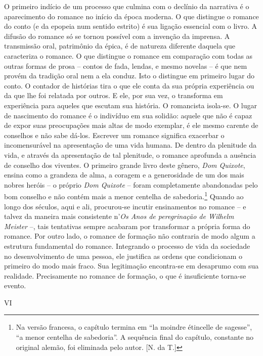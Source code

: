 O primeiro indício de um processo que culmina com o declínio da
narrativa é o aparecimento do romance no início da época moderna. O que
distingue o romance do conto (e da epopeia num sentido estrito) é sua
ligação essencial com o livro. A difusão do romance só se tornou
possível com a invenção da imprensa. A transmissão oral, patrimônio da
épica, é de natureza diferente daquela que caracteriza o romance. O que
distingue o romance em comparação com todas as outras formas de prosa --
contos de fada, lendas, e mesmo novelas -- é que nem provém da tradição
oral nem a ela conduz. Isto o distingue em primeiro lugar do conto. O
contador de histórias tira o que ele conta da sua própria experiência ou
da que lhe foi relatada por outros. E ele, por sua vez, o transforma em
experiência para aqueles que escutam sua história. O romancista
isola-se. O lugar de nascimento do romance é o indivíduo em sua solidão:
aquele que não é capaz de expor suas preocupações mais altas de modo
exemplar, é ele mesmo carente de conselhos e não sabe dá-los. Escrever
um romance significa exacerbar o incomensurável na apresentação de uma
vida humana. De dentro da plenitude da vida, e através da apresentação
de tal plenitude, o romance aprofunda a ausência de conselho dos
viventes. O primeiro grande livro deste gênero, \emph{Dom Quixote},
ensina como a grandeza de alma, a coragem e a generosidade de um dos
mais nobres heróis -- o próprio \emph{Dom Quixote} -- foram
completamente abandonadas pelo bom conselho e não contém mais a menor
centelha de sabedoria.\footnote{Na versão francesa, o capítulo termina
  em ``la moindre étincelle de sagesse'', ``a menor centelha de
  sabedoria''. A sequência final do capítulo, constante no original
  alemão, foi eliminada pelo autor. {[}N. da T.{]}} Quando ao longo dos
séculos, aqui e ali, procurou-se incutir ensinamentos no romance -- e
talvez da maneira mais consistente n'\emph{Os Anos de peregrinação de
Wilhelm Meister} --, tais tentativas sempre acabaram por transformar a
própria forma do romance. Por outro lado, o romance de formação não
contraria de modo algum a estrutura fundamental do romance. Integrando o
processo de vida da sociedade no desenvolvimento de uma pessoa, ele
justifica as ordens que condicionam o primeiro do modo mais fraco. Sua
legitimação encontra-se em desaprumo com sua realidade. Precisamente no
romance de formação, o que é insuficiente torna-se evento.

VI

